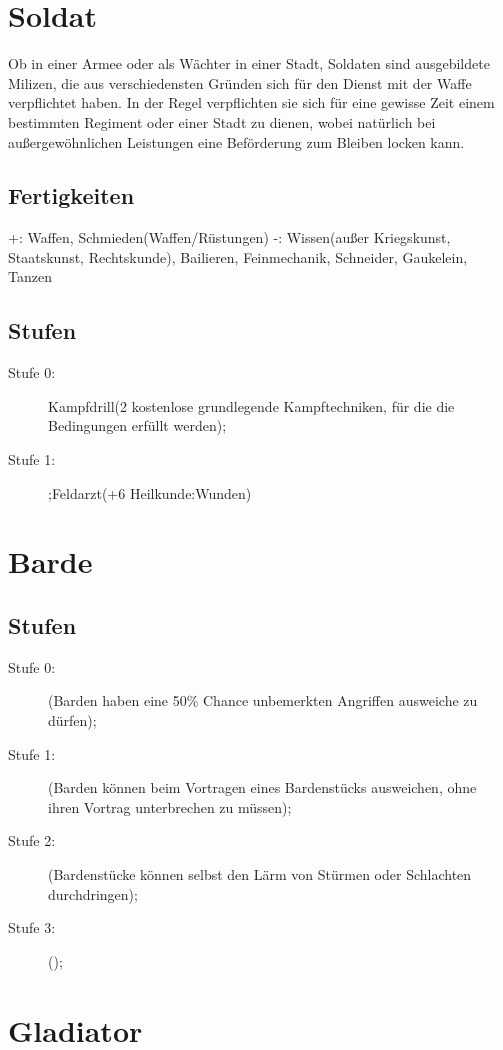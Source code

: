 \documentclass[a4paper,12pt,oneside]{book}
\begin{document}
\section{Soldat}
Ob in einer Armee oder als Wächter in einer Stadt, Soldaten sind ausgebildete Milizen, die aus verschiedensten Gründen sich für den Dienst mit der Waffe verpflichtet haben. In der Regel verpflichten sie sich für eine gewisse Zeit einem bestimmten Regiment oder einer Stadt zu dienen, wobei natürlich bei außergewöhnlichen Leistungen eine Beförderung zum Bleiben locken kann.
\subsection{Fertigkeiten}
+: Waffen, Schmieden(Waffen/Rüstungen)
-: Wissen(außer Kriegskunst, Staatskunst, Rechtskunde), Bailieren, Feinmechanik, Schneider, Gaukelein, Tanzen
\subsection{Stufen}
\begin{description}
\item[Stufe 0:]Kampfdrill(2 kostenlose grundlegende Kampftechniken, für die die Bedingungen erfüllt werden);
\item[Stufe 1:];Feldarzt(+6 Heilkunde:Wunden)
\end{description}

\section{Barde}
\subsection{Stufen}
\begin{description}
\item[Stufe 0:](Barden haben eine 50\% Chance unbemerkten Angriffen ausweiche zu dürfen); 
\item[Stufe 1:](Barden können beim Vortragen eines Bardenstücks ausweichen, ohne ihren Vortrag unterbrechen zu müssen);
\item[Stufe 2:](Bardenstücke können selbst den Lärm von Stürmen oder Schlachten durchdringen);
\item[Stufe 3:]();
\end{description}
\section{Gladiator}
\end{document}
